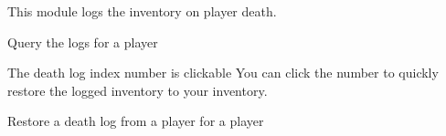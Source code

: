 
This module logs the inventory on player death.



\begin{example}{Query the logs for a player}

    \begin{tips}{The death log index number is clickable}
        You can click the number to quickly restore the logged inventory to your inventory.
    \end{tips}
\end{example}

\begin{example}{Restore a death log from a player for a player}
\end{example}
